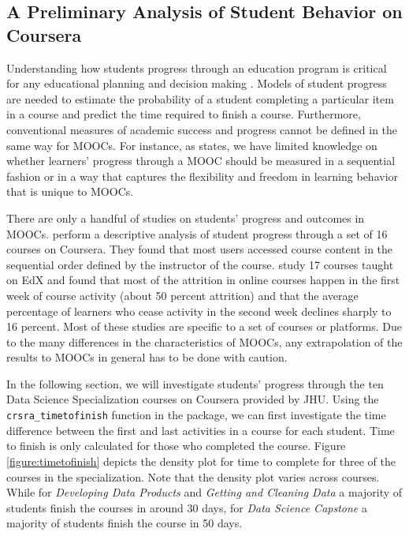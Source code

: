 \subsection{A Preliminary Analysis of Student Behavior on
Coursera}\label{a-preliminary-analysis-of-student-behavior-on-coursera}

Understanding how students progress through an education program is
critical for any educational planning and decision making
\citep{king1972primary}. Models of student progress are needed to
estimate the probability of a student completing a particular item in a
course and predict the time required to finish a course. Furthermore,
conventional measures of academic success and progress cannot be defined
in the same way for MOOCs. For instance, as \cite{perna2014moving}
states, we have limited knowledge on whether learners' progress through
a MOOC should be measured in a sequential fashion or in a way that
captures the flexibility and freedom in learning behavior that is unique
to MOOCs.

There are only a handful of studies on students' progress and outcomes
in MOOCs. \cite{perna2014moving} perform a descriptive analysis of
student progress through a set of 16 courses on Coursera. They found
that most users accessed course content in the sequential order defined
by the instructor of the course. \cite{ho2014harvardx} study 17 courses
taught on EdX and found that most of the attrition in online courses
happen in the first week of course activity (about 50 percent attrition)
and that the average percentage of learners who cease activity in the
second week declines sharply to 16 percent. Most of these studies are
specific to a set of courses or platforms. Due to the many differences
in the characteristics of MOOCs, any extrapolation of the results to
MOOCs in general has to be done with caution.

In the following section, we will investigate students' progress through
the ten Data Science Specialization courses on Coursera provided by JHU.
Using the \texttt{crsra\_timetofinish} function in the 
package, we can first investigate the time difference between the first
and last activities in a course for each student. Time to finish is only
calculated for those who completed the course. Figure
\ref{figure:timetofinish} depicts the density plot for time to complete
for three of the courses in the specialization. Note that the density
plot varies across courses. While for \emph{Developing Data Products}
and \emph{Getting and Cleaning Data} a majority of students finish the
courses in around 30 days, for \emph{Data Science Capstone} a majority
of students finish the course in 50 days.

